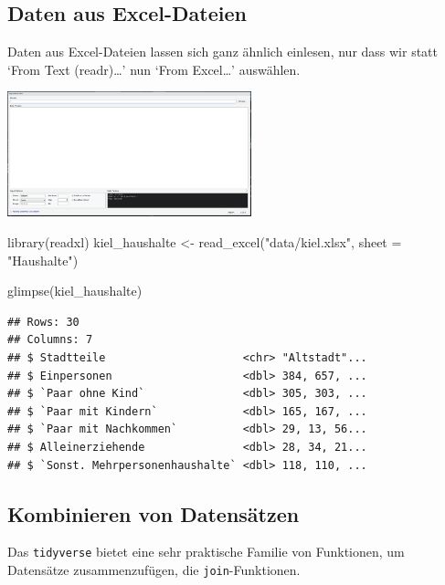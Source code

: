 \documentclass[
]{book}
\newenvironment{Shaded}{\begin{snugshade}}{\end{snugshade}}
\newcommand{\AttributeTok}[1]{\textcolor[rgb]{0.77,0.63,0.00}{#1}}
\newcommand{\FunctionTok}[1]{\textcolor[rgb]{0.00,0.00,0.00}{#1}}
\newcommand{\NormalTok}[1]{#1}
\newcommand{\OtherTok}[1]{\textcolor[rgb]{0.56,0.35,0.01}{#1}}
\newcommand{\StringTok}[1]{\textcolor[rgb]{0.31,0.60,0.02}{#1}}
\begin{document}
\hypertarget{daten-aus-excel-dateien}{%
\subsection{Daten aus Excel-Dateien}\label{daten-aus-excel-dateien}}

Daten aus Excel-Dateien lassen sich ganz ähnlich einlesen, nur dass wir statt `From Text (readr)\ldots{}' nun `From Excel\ldots{}' auswählen.

\begin{center}\includegraphics[width=200pt]{imgs/read_excel} \end{center}

\begin{Shaded}
\begin{Highlighting}[]
\FunctionTok{library}\NormalTok{(readxl)}
\NormalTok{kiel\_haushalte }\OtherTok{\textless{}{-}} \FunctionTok{read\_excel}\NormalTok{(}\StringTok{"data/kiel.xlsx"}\NormalTok{, }\AttributeTok{sheet =} \StringTok{"Haushalte"}\NormalTok{)}

\FunctionTok{glimpse}\NormalTok{(kiel\_haushalte)}
\end{Highlighting}
\end{Shaded}

\begin{verbatim}
## Rows: 30
## Columns: 7
## $ Stadtteile                     <chr> "Altstadt"...
## $ Einpersonen                    <dbl> 384, 657, ...
## $ `Paar ohne Kind`               <dbl> 305, 303, ...
## $ `Paar mit Kindern`             <dbl> 165, 167, ...
## $ `Paar mit Nachkommen`          <dbl> 29, 13, 56...
## $ Alleinerziehende               <dbl> 28, 34, 21...
## $ `Sonst. Mehrpersonenhaushalte` <dbl> 118, 110, ...
\end{verbatim}

\hypertarget{kombinieren-von-datensuxe4tzen}{%
\subsection{Kombinieren von Datensätzen}\label{kombinieren-von-datensuxe4tzen}}

Das \texttt{tidyverse} bietet eine sehr praktische Familie von Funktionen, um Datensätze zusammenzufügen, die \texttt{join}-Funktionen.
\end{document}

